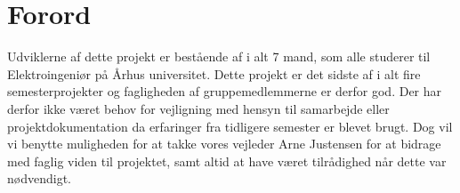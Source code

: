\chapter{Forord}
\label{ch:Forord}

Udviklerne af dette projekt er bestående af i alt 7 mand, som alle studerer til Elektroingeniør på Århus universitet. Dette projekt er det sidste af i alt fire semesterprojekter og fagligheden af gruppemedlemmerne er derfor god. Der har derfor ikke været behov for vejligning med hensyn til samarbejde eller projektdokumentation da erfaringer fra tidligere semester er blevet brugt. Dog vil vi benytte muligheden for at takke vores vejleder Arne Justensen for at bidrage med faglig viden til projektet, samt altid at have været tilrådighed når dette var nødvendigt.  
\clearpage
